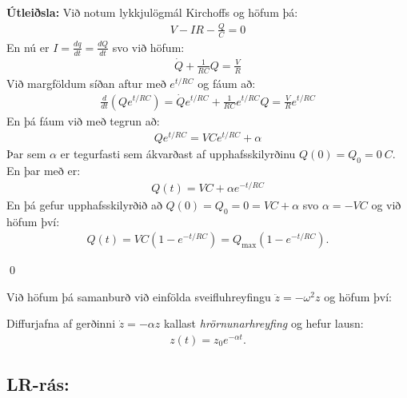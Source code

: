\textbf{Útleiðsla:} Við notum lykkjulögmál Kirchoffs og höfum þá:
\begin{align*}
    V - IR - \frac{Q}{C} = 0
\end{align*}
En nú er $I = \frac{dq}{dt} = \frac{dQ}{dt}$ svo við höfum:
\begin{align*}
    \dot{Q} + \frac{1}{RC}Q = \frac{V}{R}
\end{align*}
Við margföldum síðan aftur með $e^{t/RC}$ og fáum að:
\begin{align*}
    \frac{d}{dt}\left( Qe^{t/RC} \right) = \dot{Q}e^{t/RC} + \frac{1}{RC}e^{t/RC}Q = \frac{V}{R}e^{t/RC}
\end{align*}
En þá fáum við með tegrun að:
\begin{align*}
    Qe^{t/RC} = VCe^{t/RC} + \alpha
\end{align*}
Þar sem $\alpha$ er tegurfasti sem ákvarðast af upphafsskilyrðinu $Q(0) = Q_0 = \SI{0}{C}$. En þar með er:
\begin{align*}
    Q(t) = VC + \alpha e^{-t/RC}
\end{align*}
En þá gefur upphafsskilyrðið að $Q(0) = Q_0 = 0 = VC + \alpha$ svo $\alpha = - VC$ og við höfum því:
\begin{align*}
    Q(t) = VC\left( 1 - e^{-t/RC} \right) = Q_{\text{max}}\left(1- e^{-t/RC}\right).
\end{align*}

\qed

Við höfum þá samanburð við einfölda sveifluhreyfingu $\ddot{z} = -\omega^2 z$ og höfum því:

\begin{tcolorbox}
\begin{definition}
Diffurjafna af gerðinni $\dot{z} = -\alpha z$ kallast \emph{hrörnunarhreyfing} og hefur lausn:
\begin{align*}
    z(t) = z_0e^{-\alpha t}.
\end{align*}
\end{definition}
\end{tcolorbox}

\newpage

\subsection{LR-rás:}

